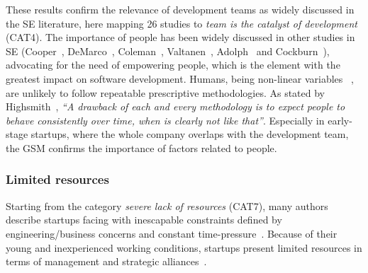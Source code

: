 \documentclass[10pt,journal,letterpaper,compsoc]{IEEEtran}
\begin{document}
These results confirm the relevance of development teams as widely discussed in
the SE literature, here mapping 26 studies to \textit{team is the catalyst of
development} (CAT4). The importance of people has been widely discussed in other
studies in SE (Cooper~\cite{Cooper1986}, DeMarco~\cite{peopleware-demarco1999},
Coleman~\cite{Coleman2004}, Valtanen~\cite{Valtanen2008}, 
Adolph~\cite{Adolph2011} and Cockburn~\cite{people-first-order}), advocating for 
the need of empowering people, which is the element with the greatest impact on
software development. Humans, being non-linear variables~\cite{Human} 
, are unlikely to follow repeatable prescriptive methodologies. As
stated by Highsmith~\cite{Highsmith2000}, \textit{``A drawback of each and
every methodology is to expect people to behave consistently over time, when is
clearly not like that''}. Especially in early-stage startups, where the whole
company overlaps with the development team, the GSM confirms the importance of
factors related to people.


\subsubsection{Limited resources}

Starting from the category \textit{severe lack of resources} (CAT7), many
authors describe startups facing with inescapable constraints defined by
engineering/business concerns and constant time-pressure~\cite{Camel1994a,
Cugola98softwareprocesses:}. Because of their young and inexperienced working
conditions, startups present limited resources in terms of management and
strategic alliances~\cite{Sutton2000}.
\end{document}
